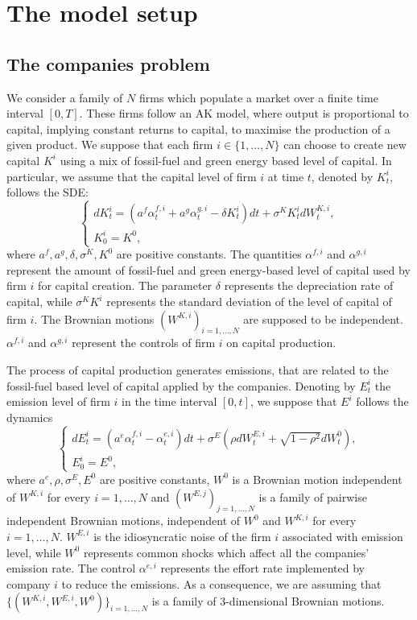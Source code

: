 \documentclass[11pt,twoside]{amsart}
\theoremstyle{definition}
\numberwithin{equation}{section}
\begin{document}
\section{The model setup}\label{sect_model_N} 
\subsection{The companies problem}\label{subsect_model_N:companies} 
We consider a family of $N$ firms which populate a market over a finite time interval $[0,T]$. These firms follow an AK model, where output is proportional to capital, implying constant returns to capital, to maximise the production of a given product. We suppose that each firm $i \in \{1, \dots, N\}$ can choose to create new capital $K^i$ using a mix of fossil-fuel and green energy based level of capital. In particular, we assume that the capital level of firm $i$ at time $t$, denoted by $K^i_t$, follows the SDE:
\begin{equation}
\label{eqn: K dynamics}
\begin{cases}
dK^i_t = (a^f \alpha^{f,i}_t + a^g \alpha^{g,i}_t - \delta K^i_t) dt + \sigma^K K^i_t dW^{K,i}_t,\\
K^i_0 = K^0,
\end{cases}
\end{equation}
where $a^f,a^g,\delta, \sigma^K, K^0$ are positive constants. The quantities $\alpha^{f,i}$ and $\alpha^{g,i}$ represent the amount of fossil-fuel and green energy-based level of capital used by firm $i$ for capital creation. The parameter $\delta$ represents the depreciation rate of capital, while $\sigma^KK^i$ represents the standard deviation of the level of capital of firm $i$. The Brownian motions $(W^{K,i})_{i = 1,\dots,N}$ are supposed to be independent.
$\alpha^{f,i}$ and $\alpha^{g,i}$ represent the controls of firm $i$ on capital production. 

The process of capital production generates emissions, that are related to the fossil-fuel based level of capital applied by the companies. Denoting by $E^i_t$ the emission level of firm $i$ in the time interval $[0,t]$, we suppose that $E^i$ follows the dynamics
\begin{equation}
\label{eqn: E dynamics}
\begin{cases}
dE^i_t = (a^e \alpha^{f,i}_t - \alpha^{e,i}_t) dt + \sigma^E(\rho dW^{E,i}_t + \sqrt{1- \rho^2} dW^0_t),\\
E^i_0 = E^0,
\end{cases}
\end{equation}
where $a^e,\rho, \sigma^E, E^0$ are positive constants, $W^0$ is a Brownian motion independent of $W^{K,i}$ for every $i = 1,\dots,N$ and $(W^{E,j})_{j=1,\dots,N}$ is a family of pairwise independent Brownian motions, independent of $W^0$ and $W^{K,i}$ for every $i = 1,\dots,N$. $W^{E,i}$ is the idiosyncratic noise of the firm $i$ associated with emission level, while $W^0$ represents common shocks which affect all the companies' emission rate. The control $\alpha^{e,i}$ represents the effort rate implemented by company $i$ to reduce the emissions. As a consequence, we are assuming that $\{(W^{K,i},W^{E,i},W^{0})\}_{i=1,\dots,N}$ is a family of 3-dimensional Brownian motions.
\end{document}
